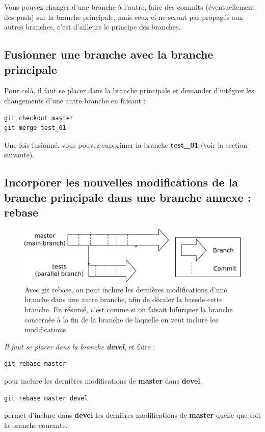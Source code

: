 \documentclass[a4paper,twoside]{article}
\begin{document}
\begin{attention}
Vous pouvez changer d'une branche à l'autre, faire des commits (éventuellement des push) sur la branche principale, mais ceux ci ne seront pas propagés aux autres branches, c'est d'ailleurs le principe des branches. 
\end{attention}

\subsection{Fusionner une branche avec la branche principale}
Pour celà, il faut se placer dans la branche principale et demander d'intégrer les changements d'une autre branche en faisant : 
\begin{verbatim}
git checkout master
git merge test_01
\end{verbatim}

Une fois fusionné, vous pouvez supprimer la branche \textbf{test\_01} (voir la section suivante).

\subsection{Incorporer les nouvelles modifications de la branche principale dans une branche annexe : rebase}
\begin{figure}[htb]
\centering
\includegraphics[width=0.75\linewidth]{figure/branchs.pdf}
\caption{Avec git rebase, on peut inclure les dernières modifications d'une branche dans une autre branche, afin de décaler la \og base\fg de cette branche. En résumé, c'est comme si on faisait bifurquer la branche concernée à la fin de la branche de laquelle on veut inclure les modifications}
\end{figure}



\emph{Il faut se placer dans la branche \textbf{devel}}, et faire :
\begin{verbatim}
git rebase master
\end{verbatim}
pour inclure les dernières modifications de \textbf{master} dans \textbf{devel}.

\begin{verbatim}
git rebase master devel
\end{verbatim}
permet d'inclure dans \textbf{devel} les dernières modifications de \textbf{master} quelle que soit la branche courante.
\bigskip
\end{document}
